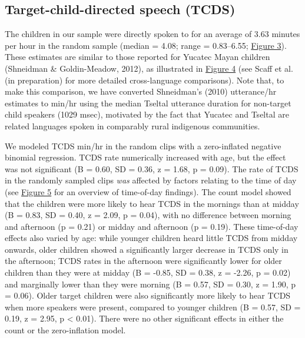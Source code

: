 \documentclass[floatsintext,man]{apa6}
\theoremstyle{definition}
\theoremstyle{definition}
\theoremstyle{definition}
\theoremstyle{remark}
\begin{document}
\subsection{Target-child-directed speech
(TCDS)}\label{target-child-directed-speech-tcds}

The children in our sample were directly spoken to for an average of
3.63 minutes per hour in the random sample (median = 4.08; range =
0.83--6.55; \protect\hyperlink{fig3}{Figure 3}). These estimates are
similar to those reported for Yucatec Mayan children (Shneidman \&
Goldin-Meadow, 2012), as illustrated in \protect\hyperlink{fig4}{Figure
4} (see Scaff et al. (in preparation) for more detailed cross-language
comparisons). Note that, to make this comparison, we have converted
Shneidman's (2010) utterance/hr estimates to min/hr using the median
Tseltal utterance duration for non-target child speakers (1029 msec),
motivated by the fact that Yucatec and Tseltal are related languages
spoken in comparably rural indigenous communities.

We modeled TCDS min/hr in the random clips with a zero-inflated negative
binomial regression. TCDS rate numerically increased with age, but the
effect was not significant (B = 0.60, SD = 0.36, z = 1.68, p = 0.09).
The rate of TCDS in the randomly sampled clips \emph{was} affected by
factors relating to the time of day (see \protect\hyperlink{fig5}{Figure
5} for an overview of time-of-day findings). The count model showed that
the children were more likely to hear TCDS in the mornings than at
midday (B = 0.83, SD = 0.40, z = 2.09, p = 0.04), with no difference
between morning and afternoon (p = 0.21) or midday and afternoon (p =
0.19). These time-of-day effects also varied by age: while younger
children heard little TCDS from midday onwards, older children showed a
significantly larger decrease in TCDS only in the afternoon; TCDS rates
in the afternoon were significantly lower for older children than they
were at midday (B = -0.85, SD = 0.38, z = -2.26, p = 0.02) and
marginally lower than they were morning (B = 0.57, SD = 0.30, z = 1.90,
p = 0.06). Older target children were also significantly more likely to
hear TCDS when more speakers were present, compared to younger children
(B = 0.57, SD = 0.19, z = 2.95, p \textless{} 0.01). There were no other
significant effects in either the count or the zero-inflation model.
\end{document}

